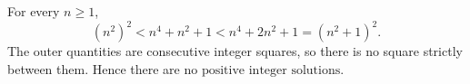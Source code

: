 For every $n\ge1$,
\[
(n^2)^2<n^4+n^2+1<n^4+2n^2+1=(n^2+1)^2.
\]
The outer quantities are consecutive integer squares, so there is no square strictly between them. Hence there are $\boxed{\text{no positive integer solutions}}$.
